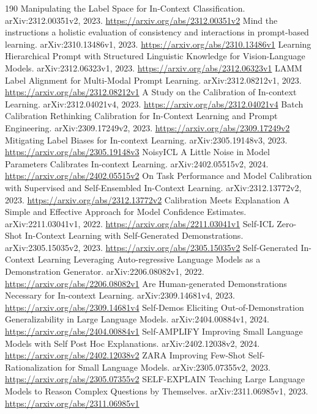 \documentclass[11pt]{article}
\begin{document}
\begin{thebibliography}{190}
 Manipulating the Label Space for In-Context Classification. arXiv:2312.00351v2, 2023. \url{https://arxiv.org/abs/2312.00351v2}
 Mind the instructions a holistic evaluation of consistency and interactions in prompt-based learning. arXiv:2310.13486v1, 2023. \url{https://arxiv.org/abs/2310.13486v1}
 Learning Hierarchical Prompt with Structured Linguistic Knowledge for Vision-Language Models. arXiv:2312.06323v1, 2023. \url{https://arxiv.org/abs/2312.06323v1}
 LAMM Label Alignment for Multi-Modal Prompt Learning. arXiv:2312.08212v1, 2023. \url{https://arxiv.org/abs/2312.08212v1}
 A Study on the Calibration of In-context Learning. arXiv:2312.04021v4, 2023. \url{https://arxiv.org/abs/2312.04021v4}
 Batch Calibration Rethinking Calibration for In-Context Learning and Prompt Engineering. arXiv:2309.17249v2, 2023. \url{https://arxiv.org/abs/2309.17249v2}
 Mitigating Label Biases for In-context Learning. arXiv:2305.19148v3, 2023. \url{https://arxiv.org/abs/2305.19148v3}
 NoisyICL A Little Noise in Model Parameters Calibrates In-context Learning. arXiv:2402.05515v2, 2024. \url{https://arxiv.org/abs/2402.05515v2}
 On Task Performance and Model Calibration with Supervised and Self-Ensembled In-Context Learning. arXiv:2312.13772v2, 2023. \url{https://arxiv.org/abs/2312.13772v2}
 Calibration Meets Explanation A Simple and Effective Approach for Model Confidence Estimates. arXiv:2211.03041v1, 2022. \url{https://arxiv.org/abs/2211.03041v1}
 Self-ICL Zero-Shot In-Context Learning with Self-Generated Demonstrations. arXiv:2305.15035v2, 2023. \url{https://arxiv.org/abs/2305.15035v2}
 Self-Generated In-Context Learning Leveraging Auto-regressive Language Models as a Demonstration Generator. arXiv:2206.08082v1, 2022. \url{https://arxiv.org/abs/2206.08082v1}
 Are Human-generated Demonstrations Necessary for In-context Learning. arXiv:2309.14681v4, 2023. \url{https://arxiv.org/abs/2309.14681v4}
 Self-Demos Eliciting Out-of-Demonstration Generalizability in Large Language Models. arXiv:2404.00884v1, 2024. \url{https://arxiv.org/abs/2404.00884v1}
 Self-AMPLIFY Improving Small Language Models with Self Post Hoc Explanations. arXiv:2402.12038v2, 2024. \url{https://arxiv.org/abs/2402.12038v2}
 ZARA Improving Few-Shot Self-Rationalization for Small Language Models. arXiv:2305.07355v2, 2023. \url{https://arxiv.org/abs/2305.07355v2}
 SELF-EXPLAIN Teaching Large Language Models to Reason Complex Questions by Themselves. arXiv:2311.06985v1, 2023. \url{https://arxiv.org/abs/2311.06985v1}

\end{thebibliography}
\end{document}
